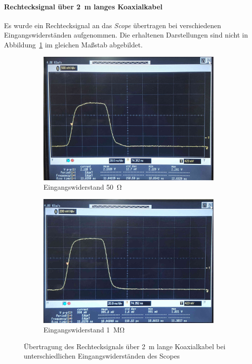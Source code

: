 \documentclass[a4paper,twoside,final]{article}
\begin{document}
\paragraph{Rechtecksignal über \SI{2}{\metre} langes Koaxialkabel}
Es wurde ein Rechtecksignal an das \textit{Scope} übertragen bei verschiedenen Eingangswiderständen aufgenommen. Die erhaltenen Darstellungen sind nicht in Abbildung~\ref{fig:Rechtecksignal_Koaxialkabel} im gleichen Maßstab abgebildet.
\begin{figure}[h]
  \centering
  \begin{subfigure}{0.45\textwidth}
    \includegraphics[width=\textwidth]{Bilder/Bild1.jpg}
    \caption{Eingangswiderstand \SI{50}{\ohm}}
  \end{subfigure}\hspace{1cm}
  \begin{subfigure}{0.45\textwidth}
    \includegraphics[width=\textwidth]{Bilder/Bild2.jpg}
    \caption{Eingangswiderstand \SI{1}{\mega\ohm}}
  \end{subfigure}
  \caption{Übertragung des Rechtecksignals über \SI{2}{\metre} lange Koaxialkabel bei unterschiedlichen Eingangswiderständen des Scopes}
  \label{fig:Rechtecksignal_Koaxialkabel}
\end{figure}\\
\end{document}
